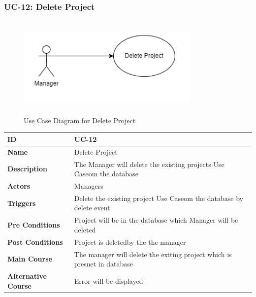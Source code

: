     \subsubsection{UC-12: Delete Project}
    \begin{figure}[H]
        \includegraphics[height=5cm, width=0.8\textwidth]{./diagrams/Use Case/u12.png}
        \centering 
        \caption{Use Case Diagram for Delete Project}
        \label{fig:Usecase1}
        \end{figure}
        
    \begin{center}
        \begin{tabularx}{\textwidth}{|l|X|}
            \hline
            \textbf{ID} & UC-12 \\
            \hline
            \textbf{Name} & Delete Project \\
            \hline
            \textbf{Description} & The Manager will delete the existing projects Use Caseom the database \\
            \hline
            \textbf{Actors} & Managers \\
            \hline
            \textbf{Triggers} & Delete the existing project Use Caseom the database by delete event \\
            \hline
            \textbf{Pre Conditions} & Project will be in the database which Manager will be deleted \\
            \hline
            \textbf{Post Conditions} & Project is deletedby the the manager \\
            \hline
            \textbf{Main Course} & The manager will delete the exiting project which is presnet in database \\
            \hline
            \textbf{Alternative Course} & Error will be displayed \\
            \hline
            
        \end{tabularx}
    \end{center}
    \newpage
    

